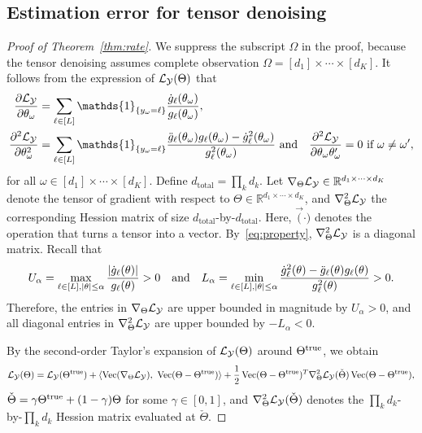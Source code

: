 \documentclass[11pt]{article}
\theoremstyle{plain}
\theoremstyle{definition}
\begin{document}
\subsection{Estimation error for tensor denoising}
\begin{proof}[Proof of Theorem~\ref{thm:rate}]
We suppress the subscript $\Omega$ in the proof, because the tensor denoising assumes complete observation $\Omega=[d_1]\times \cdots \times [d_K]$. It follows from the expression of $\mathcal{L}_{\mathcal{Y}}(\Theta)$ that
\begin{align}\label{eq:property}
{\partial \flogl\over \partial \theta_\omega}&=\sum_{\ell\in[L]}\mathds{1}_{\{y_{\omega}=\ell\}}
{\dot{g}_\ell(\theta_\omega)\over g_\ell(\theta_\omega)},\notag\\
{\partial^2 \flogl\over \partial \theta_\omega^2}&=\sum_{\ell\in[L]}\mathds{1}_{\{y_\omega=\ell\}}{\ddot{g}_\ell(\theta_\omega)g_\ell(\theta_\omega)-\dot{g}^2_\ell(\theta_\omega)\over g^2_\ell(\theta_\omega)}\ \text{and}\quad
{\partial^2 \flogl\over \partial \theta_\omega \theta_\omega'}=0\ \text{if}\ \omega\neq \omega',
\end{align}
for all $\omega\in[d_1]\times \cdots \times [d_K]$.
Define $d_{\text{total}}=\prod_k d_k$. Let $\nabla_{\Theta}\mathcal{L}_{\mathcal{Y}}\in\mathbb{R}^{d_1\times\cdots\times d_K}$ denote the tensor of gradient with respect to $\Theta\in\mathbb{R}^{d_1\times \cdots\times d_K}$, and $\nabla^2_{\Theta}\mathcal{L}_{\mathcal{Y}}$ the corresponding Hession matrix of size $d_\text{total}$-by-$d_{\text{total}}$. Here, $\Vec(\cdot)$ denotes the operation that turns a tensor into a vector. By~\eqref{eq:property}, $\nabla^2_{\Theta}\mathcal{L}_{\mathcal{Y}}$ is a diagonal matrix. Recall that
\begin{equation}\label{eq:bound}
U_\alpha=\max_{\ell\in[L],|\theta|\leq \alpha}{|\dot{g}_\ell(\theta)|\over g_\ell(\theta)}>0 \quad \text{and}\quad
L_\alpha=\min_{\ell\in[L],|\theta|\leq \alpha} {\dot{g}^2_\ell(\theta)-\ddot{g}_\ell(\theta)g_\ell(\theta)\over g^2_\ell(\theta)}>0.
\end{equation}
Therefore, the entries in $\nabla_{\Theta}\mathcal{L}_{\mathcal{Y}}$ are upper bounded in magnitude by $U_\alpha>0$, and all diagonal entries in $\nabla^2_{\Theta}\mathcal{L}_{\mathcal{Y}}$ are upper bounded by $-L_{\alpha}<0$.

By the second-order Taylor's expansion of $\mathcal{L}_{\mathcal{Y}}(\Theta)$ around $\Theta^{\mathrm{true}}$, we obtain
\begin{equation}\label{eq:taylor}
\flogl(\Theta)=\flogl(\trueT)+\langle\Vec(\fplogl),\ \Vec(\Theta-\trueT)\rangle+{1\over 2}\Vec(\Theta-\trueT)^T\fpplogl(\check\Theta)\Vec(\Theta-\trueT),
\end{equation}
$\check\Theta=\gamma\Theta^{\mathrm{true}}+(1-\gamma)\Theta$ for some $\gamma\in[0,1]$, and $\nabla^2_{\Theta}\mathcal{L}_{\mathcal{Y}}(\check\Theta)$ denotes the $\prod_kd_k$-by-$\prod_k d_k$ Hession matrix evaluated at $\check\Theta$.


\end{proof}
\end{document}
